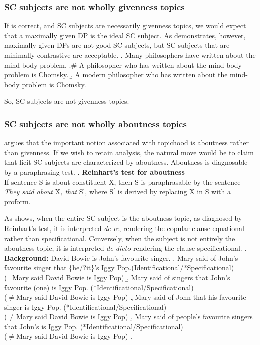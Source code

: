 \documentclass[GPFinal]{subfiles}
\begin{document}
\subsubsection{SC subjects are not wholly givenness topics}
If \textcite{mikkelsen2004specifying} is correct, and SC subjects are necessarily givenness topics, we would expect that a maximally given DP is the ideal SC subject.
As \Next demonstrates, however, maximally given DPs are not good SC subjects, but SC subjects that are minimally contrastive are acceptable.
\ex. Many philosophers have written about the mind-body problem.
\a.\# A philosopher who has written about the mind-body problem is Chomsky.
\b. A modern philosopher who has written about the mind-body problem is Chomsky.

So, SC subjects are not givenness topics.
\subsubsection{SC subjects are not wholly aboutness topics}
\textcite{reinhart1981pragmatics} argues that the important notion associated with topichood is aboutness rather than givenness.
If we wish to retain  analysis, the natural move would be to claim that licit SC subjects are characterized by aboutness.
Aboutness is diagnosable by a paraphrasing test.
\ex. \textbf{Reinhart's test for aboutness}\\
If sentence S is about constituent X, then S is paraphrasable by the sentence \textit{They said about }X\textit{, that }S$^\prime$, where S$^\prime$ is derived by replacing X in S with a proform.

As \Next shows, when the entire SC subject is the aboutness topic, as diagnosed by Reinhart's test, it is interpreted \textit{de re}, rendering the copular clause equational rather than specificational.
Ccnversely, when the subject is not entirely the aboutness topic, it is interpreted \textit{de dicto} rendering the clause specificational.
\ex. \textbf{Background:} David Bowie is John's favourite singer.
\a. Mary said of John's favourite singer that \{he/?it\}'s Iggy Pop.(Identificational/*Specificational)\\
(=Mary said David Bowie is Iggy Pop)
\b. Mary said of singers that John's favourite (one) is Iggy Pop. (*Identificational/Specificational)\\
($\neq$Mary said David Bowie is Iggy Pop)
\c. Mary said of John that his favourite singer is Iggy Pop. (*Identificational/Specificational)\\
($\neq$Mary said David Bowie is Iggy Pop)
\d. Mary said of people's favourite singers that John's is Iggy Pop. (*Identificational/Specificational)\\
($\neq$Mary said David Bowie is Iggy Pop)
\z.
\end{document}
